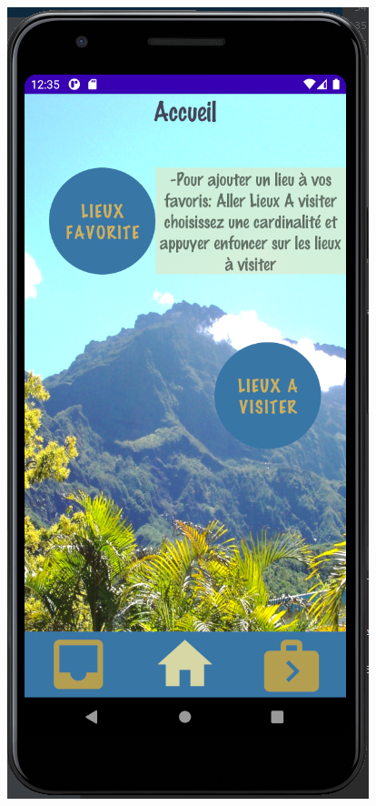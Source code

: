 \documentclass{article}
\begin{document}
\begin{minipage}{0.3\textwidth}
\includegraphics[width=\textwidth]{Acceuil}
\end{minipage}
\end{document}
